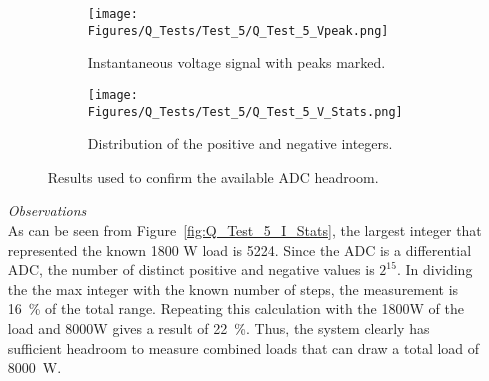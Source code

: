 \begin{itemize}
    \begin{figure}[H]
     \centering
     \begin{subfigure}[b]{0.495\textwidth}
        \centering
        \texttt{[image: Figures/Q\_Tests/Test\_5/Q\_Test\_5\_Vpeak.png]}
        \caption{Instantaneous voltage signal with peaks marked.}
        \label{fig:Q_Test_5_V_peak}
     \end{subfigure}
     \hfill
     \begin{subfigure}[b]{0.495\textwidth}
        \centering
        \texttt{[image: Figures/Q\_Tests/Test\_5/Q\_Test\_5\_V\_Stats.png]}
        \caption{Distribution of the positive and negative integers.}
        \label{fig:Q_Test_5_V_Stats}
     \end{subfigure}
        \caption{Results used to confirm the available ADC headroom.}
        \label{fig:Q_Test_5_V}
    \end{figure}
    \item [\emph{Observations}]\mbox{}\\
    As can be seen from Figure~\ref{fig:Q_Test_5_I_Stats}, the largest integer that represented the known 1800 W load is 5224. Since the ADC is a differential ADC, the number of distinct positive and negative values is $2^{15}$. In dividing the the max integer with the known number of steps, the measurement is \qty{16}{\percent} of the total range. Repeating this calculation with the 1800W of the load and 8000W gives a result of  \qty{22}{\percent}. Thus, the system clearly has sufficient headroom to measure combined loads that can draw a total load of \qty{8000}{\watt}. 
    
\end{itemize}

\newpage



